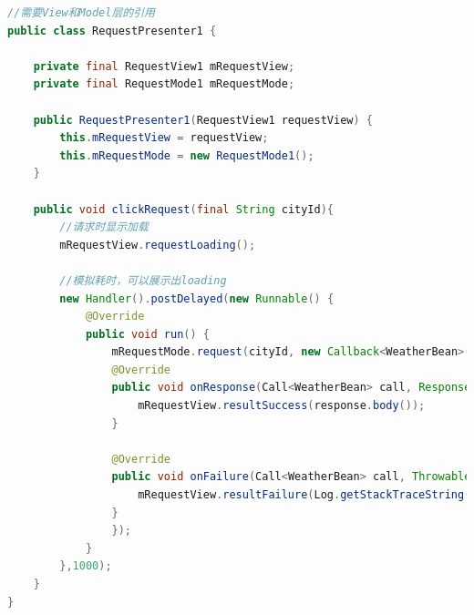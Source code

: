 \documentclass[a4paper,12pt]{ctexart}
\begin{document}
\begin{lstlisting}[language=java]
//需要View和Model层的引用
public class RequestPresenter1 {
	
	private final RequestView1 mRequestView;
	private final RequestMode1 mRequestMode;
	
	public RequestPresenter1(RequestView1 requestView) {
		this.mRequestView = requestView;
		this.mRequestMode = new RequestMode1();
	}
	
	public void clickRequest(final String cityId){
		//请求时显示加载
		mRequestView.requestLoading();
		
		//模拟耗时，可以展示出loading
		new Handler().postDelayed(new Runnable() {
			@Override
			public void run() {
				mRequestMode.request(cityId, new Callback<WeatherBean>() {
				@Override
				public void onResponse(Call<WeatherBean> call, Response<WeatherBean> response) {
					mRequestView.resultSuccess(response.body());
				}
				
				@Override
				public void onFailure(Call<WeatherBean> call, Throwable t) {
					mRequestView.resultFailure(Log.getStackTraceString(t));
				}
				});
			}
		},1000);
	}
}
\end{lstlisting}
\end{document}
